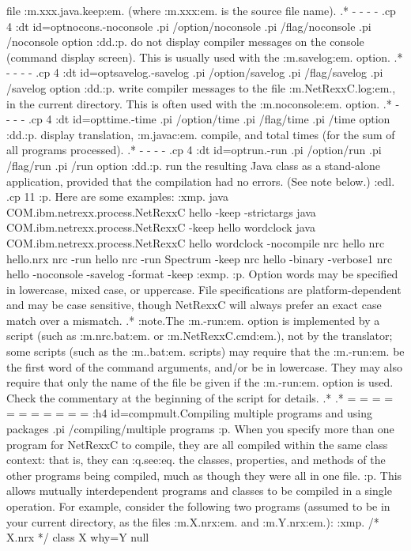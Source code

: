 file :m.xxx.java.keep:em. (where :m.xxx:em. is the source file name).
.* - - - -
.cp 4
:dt id=optnocons.-noconsole
.pi /option/noconsole
.pi /flag/noconsole
.pi /noconsole option
:dd.:p.
do not display compiler messages on the console (command display
screen).  This is usually used with the :m.savelog:em. option.
.* - - - -
.cp 4
:dt id=optsavelog.-savelog
.pi /option/savelog
.pi /flag/savelog
.pi /savelog option
:dd.:p.
write compiler messages to the file :m.NetRexxC.log:em., in the current
directory.
This is often used with the :m.noconsole:em. option.
.* - - - -
.cp 4
:dt id=opttime.-time
.pi /option/time
.pi /flag/time
.pi /time option
:dd.:p.
display translation, :m.javac:em. compile, and total times (for the sum
of all programs processed).
.* - - - -
.cp 4
:dt id=optrun.-run
.pi /option/run
.pi /flag/run
.pi /run option
:dd.:p.
run the resulting Java class as a stand-alone application, provided that
the compilation had no errors.
(See note below.)
:edl.
.cp 11
:p.
Here are some examples:
:xmp.
java COM.ibm.netrexx.process.NetRexxC hello -keep -strictargs
java COM.ibm.netrexx.process.NetRexxC -keep hello wordclock
java COM.ibm.netrexx.process.NetRexxC hello wordclock -nocompile
nrc hello
nrc hello.nrx
nrc -run hello
nrc -run Spectrum -keep
nrc hello -binary -verbose1
nrc hello -noconsole -savelog -format -keep
:exmp.
:p.
Option words may be specified in lowercase, mixed case, or uppercase.
File specifications are platform-dependent and may be case sensitive,
though NetRexxC will always prefer an exact case match over a mismatch.
.*
:note.The :m.-run:em. option is implemented by a script (such
as :m.nrc.bat:em. or :m.NetRexxC.cmd:em.), not by the translator; some
scripts (such as the :m..bat:em. scripts) may require that
the :m.-run:em. be the first word of the command arguments, and/or be in
lowercase.  They may also require that only the name of the file be
given if the :m.-run:em. option is used.  Check the commentary at the
beginning of the script for details.
.*
.* = = = = = = = = = = =
:h4 id=compmult.Compiling multiple programs and using packages
.pi /compiling/multiple programs
:p.
When you specify more than one program for NetRexxC to compile, they are
all compiled within the same class context: that is, they can :q.see:eq.
the classes, properties, and methods of the other programs being
compiled, much as though they were all in one file.
:p.
This allows mutually interdependent programs and classes to be compiled
in a single operation.  For example, consider the following two programs
(assumed to be in your current directory, as the files :m.X.nrx:em.
and :m.Y.nrx:em.):
:xmp.
/* X.nrx */
class X
  why=Y null

